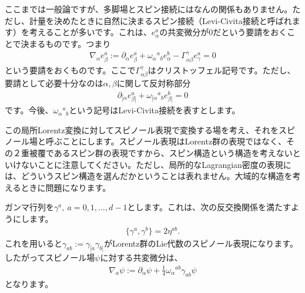 \documentclass[report,paper=a4, fontsize=12pt, line_length=16cm, number_of_lines=33,dvipdfmx]{jlreq}
\numberwithin{equation}{chapter}
\numberwithin{equation}{section}
\newcommand{\del}{\partial}
\begin{document}
ここまでは一般論ですが、多脚場とスピン接続にはなんの関係もありません。ただし、計量を決めたときに自然に決まるスピン接続（Levi-Civita接続と呼ばれます）を考えることが多いです。これは、$e^{a}_{\alpha}$の共変微分が$0$だという要請をおくことで決まるものです。つまり
\begin{align}
  \nabla_{\alpha}e^{a}_{\beta}:=\del_{\alpha}e^{a}_{\beta}+\omega_{\alpha}{}^{a}{}_{b}e^{b}_{\alpha}-\Gamma^{\gamma}_{\alpha\beta}e^{a}_{\gamma}=0
\end{align}
という要請をおくものです。ここで$\Gamma^{\gamma}_{\alpha\beta}$はクリストッフェル記号です。ただし、要請として必要十分なのは$\alpha,\beta$に関して反対称部分
\begin{align}
  \del_{[\alpha}e^{a}_{\beta]}+\omega_{[\alpha}{}^{a}{}_{b}e^{b}_{\beta]}=0
\end{align}
です。今後、$\omega_{\alpha}{}^{a}{}_{b}$という記号はLevi-Civita接続を表すとします。

この局所Lorentz変換に対してスピノール表現で変換する場を考え、それをスピノール場と呼ぶことにします。スピノール表現はLorentz群の表現ではなく、その２重被覆であるスピン群の表現ですから、スピン構造という構造を考えないといけないことに注意してください。ただし、局所的なLagrangian密度の表現には、どういうスピン構造を選んだかということは表れません。大域的な構造を考えるときに問題になります。

ガンマ行列を$\gamma^{a},\ a=0,1,\dots,d-1$とします。これは、次の反交換関係を満たすようにします。
\begin{align}
  \{\gamma^{a},\gamma^{b}\}=2\eta^{ab}.
\end{align}
これを用いると$\gamma_{ab}:=\gamma_{[a}\gamma_{b]}$がLorentz群のLie代数のスピノール表現になります。したがってスピノール場$\psi$に対する共変微分は、
\begin{align}
  \nabla_{a}\psi:=\del_{\alpha}\psi+\frac14\omega_{\alpha}{}^{ab}\gamma_{ab}\psi
\end{align}
となります。
\end{document}
